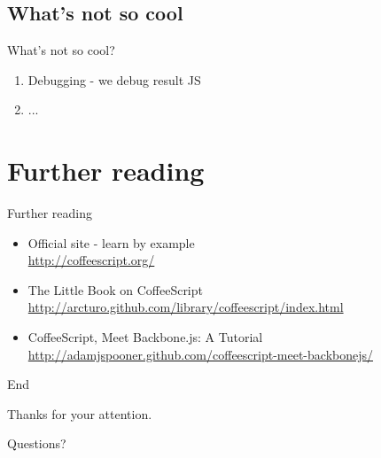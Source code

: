 \documentclass[xcolor=dvipsnames]{beamer}
\newcommand{\slide}[1]{\begin{frame}[fragile]{{#1}}}
\begin{document}
\subsection{What's not so cool}
\slide{What's not so cool?}
    \begin{enumerate}
        \item Debugging - we debug result JS
        \item ...
    \end{enumerate}
\end{frame}


\section{Further reading}
\slide{Further reading}
    \begin{itemize}
        \item Official site - learn by example \\
            \url{http://coffeescript.org/}
        \item The Little Book on CoffeeScript \\
            \url{http://arcturo.github.com/library/coffeescript/index.html}
        \item CoffeeScript, Meet Backbone.js: A Tutorial \\
            \url{http://adamjspooner.github.com/coffeescript-meet-backbonejs/}
    \end{itemize}
\end{frame}


\slide{End}
    \begin{center}
        Thanks for your attention.
        
        \vspace{2 cm}
        \pause
        Questions?
    \end{center}
\end{frame}
\end{document}
